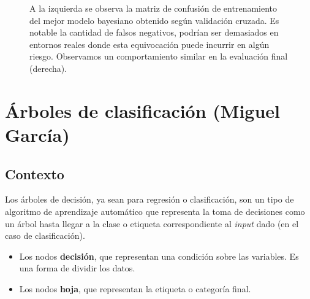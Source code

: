 \documentclass[12pt,letterpaper]{article}
\begin{document}
\begin{figure}[htp]
\centering
{}
\caption{A la izquierda se observa la matriz de confusión de entrenamiento del mejor modelo bayesiano obtenido según validación cruzada. Es notable la cantidad de falsos negativos, podrían ser demasiados en entornos reales donde esta equivocación puede incurrir en algún riesgo.
Observamos un comportamiento similar en la evaluación final (derecha). }
\label{fig:BayesMatrix}
\end{figure}


\section{Árboles de clasificación (Miguel García)}
\subsection{Contexto}
Los árboles de decisión, ya sean para regresión o clasificación, son un tipo de algoritmo de aprendizaje automático que representa la toma de decisiones como un árbol hasta llegar a la clase o etiqueta correspondiente al \textit{input} dado (en el caso de clasificación).

\begin{itemize}
    \item Los nodos \textbf{decisión}, que representan una condición sobre las variables. Es una forma de dividir los datos.
    \item Los nodos \textbf{hoja}, que representan la etiqueta o categoría final.
\end{itemize}
\end{document}
